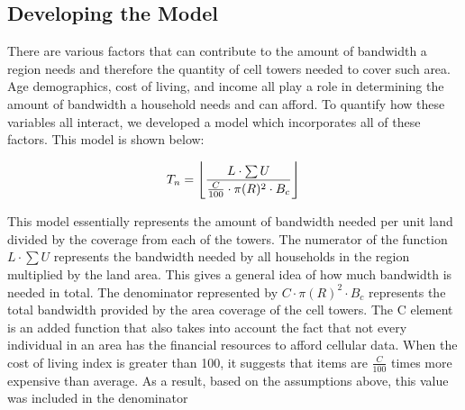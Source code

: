 \documentclass[12pt]{article}
\begin{document}
\subsection{Developing the Model}
There are various factors that can contribute to the amount of bandwidth a region needs and therefore the quantity of cell towers needed to cover such area. Age demographics, cost of living, and income all play a role in determining the amount of bandwidth a household needs and can afford. To quantify how these variables all interact, we developed a model which incorporates all of these factors. This model is shown below:

\begin{equation*}
T_n = \left\lfloor \frac{L\cdot\sum{U}}{\frac{C}{100}\cdot\pi(R)^2\cdot B_c} \right\rfloor\\
\end{equation*}

This model essentially represents the amount of bandwidth needed per unit land divided by the coverage from each of the towers. The numerator of the function $L\cdot\sum{U}$ represents the bandwidth needed by all households in the region multiplied by the land area. This gives a general idea of how much bandwidth is needed in total. The denominator represented by $C\cdot\pi(R)^2\cdot B_c$ represents the total bandwidth provided by the area coverage of the cell towers. The C element is an added function that also takes into account the fact that not every individual in an area has the financial resources to afford cellular data. When the cost of living index is greater than 100, it suggests that items are $\frac{C}{100}$ times more expensive than average. As a result, based on the assumptions above, this value was included in the denominator
\\
\\
\end{document}
